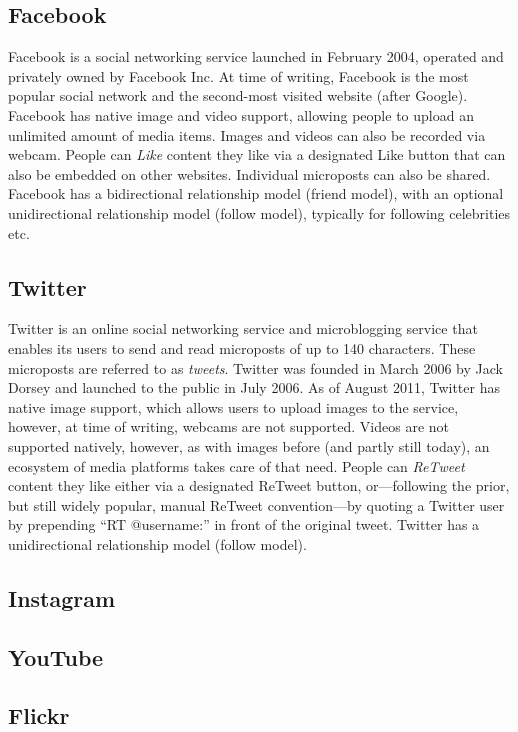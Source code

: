 \subsection{Facebook}
Facebook is a social networking service launched in February 2004,
operated and privately owned by Facebook Inc.
At time of writing, Facebook is the most popular social network
and the second-most visited website (after Google).
Facebook has native image and video support,
allowing people to upload an unlimited amount of media items.
Images and videos can also be recorded via webcam.
People can \emph{Like} content they like via a designated Like button
that can also be embedded on other websites.
Individual microposts can also be shared.
Facebook has a bidirectional relationship model (friend model),
with an optional unidirectional relationship model (follow model),
typically for following celebrities etc.

\subsection{Twitter}
Twitter is an online social networking service and microblogging service
that enables its users to send and read microposts of up to 140 characters.
These microposts are referred to as \emph{tweets}.
Twitter was founded in March 2006 by Jack Dorsey and launched to the public in July 2006.
As of August 2011, Twitter has native image support,
which allows users to upload images to the service, however, at time of writing,
webcams are not supported.
Videos are not supported natively, however, as with images before (and partly still today),
an ecosystem of media platforms takes care of that need.
People can \emph{ReTweet} content they like either via a designated ReTweet button,
or---following the prior, but still widely popular, manual ReTweet convention---by
quoting a Twitter user by prepending ``RT @username:'' in front of the original tweet.
Twitter has a unidirectional relationship model (follow model).

\subsection{Instagram}

\subsection{YouTube}

\subsection{Flickr}

